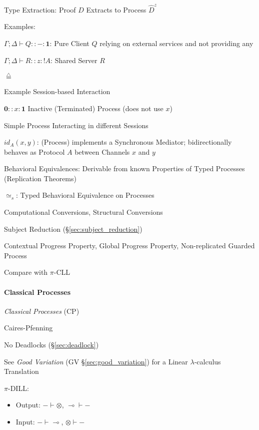 Type Extraction: Proof $D$ Extracts to Process $\hat{D}^z$

Examples:

$\Gamma; \Delta \vdash Q :: -:\mathbf{1}$: Pure Client $Q$ relying on
external services and not providing any

$\Gamma; \Delta \vdash R :: z:!A$: Shared Server $R$

$\stackrel{\triangle}{=}$

Example Session-based Interaction %

$\mathbf{0} :: x : \mathbf{1}$ Inactive (Terminated) Process (does not
use $x$)

Simple Process Interacting in different Sessions %

$id_A(x,y)$: (Process) implements a Synchronous Mediator;
bidirectionally behaves as Protocol $A$ between Channels $x$ and $y$

Behavioral Equivalences: Derivable from known Properties of Typed
Processes (Replication Theorems)

$\simeq_s$: Typed Behavioral Equivalence on Processes

Computational Conversions, Structural Conversions

Subject Reduction (\S\ref{sec:subject_reduction})

Contextual Progress Property, Global Progress Property,
Non-replicated Guarded Process %

Compare with $\pi$-CLL %



\paragraph{Classical Processes}\label{sec:classical_processes}\hfill
\cite{wadler12}

\emph{Classical Processes} (CP)

Caires-Pfenning \cite{caires-pfenning10}

No Deadlocks (\S\ref{sec:deadlock})

\fist See \emph{Good Variation} (GV \S\ref{sec:good_variation}) for a
Linear $\lambda$-calculus Translation

$\pi$-DILL:
\begin{itemize}
  \item Output: $- \vdash \otimes$, $\multimap \vdash -$

  \item Input: $- \vdash \multimap$, $\otimes \vdash -$
\end{itemize}


